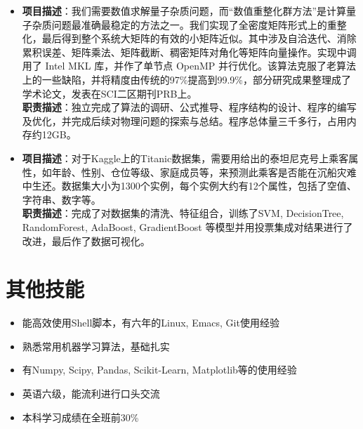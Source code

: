 \documentclass{resume}
\begin{document}
\begin{itemize}
\item {}
{\textbf{项目描述}：我们需要数值求解量子杂质问题，而“数值重整化群方法”是计算量子杂质问题最准确最稳定的方法之一。我们实现了全密度矩阵形式上的重整化，最后得到整个系统大矩阵的有效的小矩阵近似。其中涉及自洽迭代、消除累积误差、矩阵乘法、矩阵截断、稠密矩阵对⻆化等矩阵向量操作。实现中调用了 Intel MKL 库，并作了单节点 OpenMP 并行优化。该算法克服了老算法上的一些缺陷，并将精度由传统的97\%提高到99.9\%，部分研究成果整理成了学术论文，发表在SCI二区期刊PRB上。}\\
\textbf{职责描述}：独立完成了算法的调研、公式推导、程序结构的设计、程序的编写及优化，并完成后续对物理问题的探索与总结。程序总体量三千多行，占用内存约12GB。
\item {}
\textbf{项目描述}：对于Kaggle上的Titanic数据集，需要用给出的泰坦尼克号上乘客属性，如年龄、性别、仓位等级、家庭成员等，来预测此乘客是否能在沉船灾难中生还。数据集大小为1300个实例，每个实例大约有12个属性，包括了空值、字符串、数字等。\\
\textbf{职责描述}：完成了对数据集的清洗、特征组合，训练了SVM, DecisionTree, RandomForest, AdaBoost, GradientBoost 等模型并用投票集成对结果进行了改进，最后作了数据可视化。
\end{itemize}

\section{其他技能}
\begin{itemize}%
\item 能高效使用Shell脚本，有六年的Linux, Emacs, Git使用经验
\item 熟悉常用机器学习算法，基础扎实
\item 有Numpy, Scipy, Pandas, Scikit-Learn, Matplotlib等的使用经验
\item 英语六级，能流利进行口头交流
\item 本科学习成绩在全班前30\%
\end{itemize}
\end{document}

